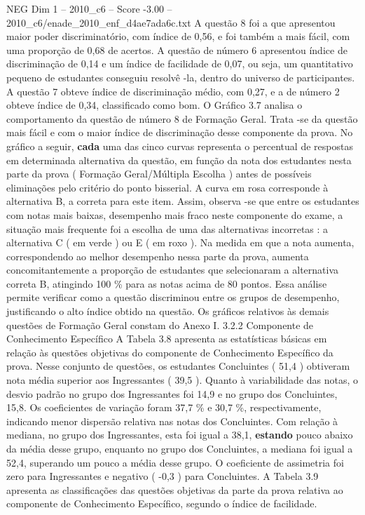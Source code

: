 \begin{textsample}{NEG Dim 1 – 2010\_c6 – Score -3.00 – 2010\_c6/enade\_2010\_enf\_d4ae7ada6c.txt}
A questão 8 foi a que apresentou maior poder discriminatório, com índice de 0,56, e foi também a mais fácil, com uma proporção de 0,68 de acertos.
A questão de número 6 apresentou índice de discriminação de 0,14 e um índice de facilidade de 0,07, ou seja, um quantitativo pequeno de estudantes conseguiu resolvê -la, dentro do universo de participantes.
A questão 7 obteve índice de discriminação médio, com 0,27, e a de número 2 obteve índice de 0,34, classificado como bom.
O Gráfico 3.7 analisa o comportamento da questão de número 8 de Formação Geral.
Trata -se da questão mais fácil e com o maior índice de discriminação desse componente da prova.
No gráfico a seguir, \textbf{cada} uma das cinco curvas representa o percentual de respostas em determinada alternativa da questão, em função da nota dos estudantes nesta parte da prova ( Formação Geral/Múltipla Escolha ) antes de possíveis eliminações pelo critério do ponto bisserial.
A curva em rosa corresponde à alternativa B, a correta para este item.
Assim, observa -se que entre os estudantes com notas mais baixas, desempenho mais fraco neste componente do exame, a situação mais frequente foi a escolha de uma das alternativas incorretas : a alternativa C ( em verde ) ou E ( em roxo ).
Na medida em que a nota aumenta, correspondendo ao melhor desempenho nessa parte da prova, aumenta concomitantemente a proporção de estudantes que selecionaram a alternativa correta B, atingindo 100 \% para as notas acima de 80 pontos.
Essa análise permite verificar como a questão discriminou entre os grupos de desempenho, justificando o alto índice obtido na questão.
Os gráficos relativos às demais questões de Formação Geral constam do Anexo I. 3.2.2 Componente de Conhecimento Específico A Tabela 3.8 apresenta as estatísticas básicas em relação às questões objetivas do componente de Conhecimento Específico da prova.
Nesse conjunto de questões, os estudantes Concluintes ( 51,4 ) obtiveram nota média superior aos Ingressantes ( 39,5 ).
Quanto à variabilidade das notas, o desvio padrão no grupo dos Ingressantes foi 14,9 e no grupo dos Concluintes, 15,8.
Os coeficientes de variação foram 37,7 \% e 30,7 \%, respectivamente, indicando menor dispersão relativa nas notas dos Concluintes.
Com relação à mediana, no grupo dos Ingressantes, esta foi igual a 38,1, \textbf{estando} pouco abaixo da média desse grupo, enquanto no grupo dos Concluintes, a mediana foi igual a 52,4, superando um pouco a média desse grupo.
O coeficiente de assimetria foi zero para Ingressantes e negativo ( -0,3 ) para Concluintes.
A Tabela 3.9 apresenta as classificações das questões objetivas da parte da prova relativa ao componente de Conhecimento Específico, segundo o índice de facilidade.

\end{textsample}
